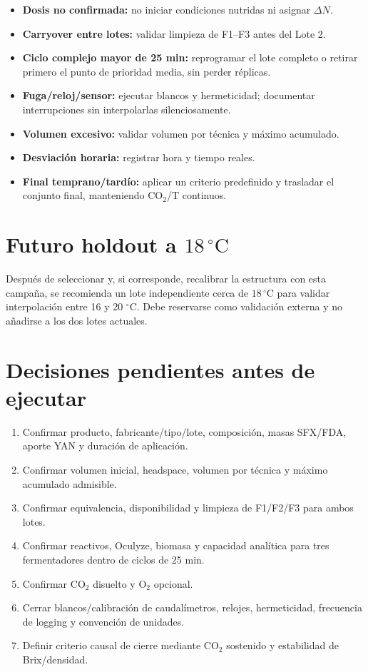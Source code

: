 \documentclass[11pt,a4paper]{article}
\begin{document}
\begin{itemize}[leftmargin=*]
  \item \textbf{Dosis no confirmada:} no iniciar condiciones nutridas ni asignar
  \(\Delta N\).
  \item \textbf{Carryover entre lotes:} validar limpieza de F1--F3 antes del
  Lote 2.
  \item \textbf{Ciclo complejo mayor de 25 min:} reprogramar el lote completo o
  retirar primero el punto de prioridad media, sin perder réplicas.
  \item \textbf{Fuga/reloj/sensor:} ejecutar blancos y hermeticidad; documentar
  interrupciones sin interpolarlas silenciosamente.
  \item \textbf{Volumen excesivo:} validar volumen por técnica y máximo acumulado.
  \item \textbf{Desviación horaria:} registrar hora y tiempo reales.
  \item \textbf{Final temprano/tardío:} aplicar un criterio predefinido y trasladar
  el conjunto final, manteniendo CO$_2$/T continuos.
\end{itemize}

\section{Futuro holdout a \(18\,^{\circ}\mathrm{C}\)}

Después de seleccionar y, si corresponde, recalibrar la estructura con esta
campaña, se recomienda un lote independiente cerca de \(18\,^{\circ}\mathrm{C}\)
para validar interpolación entre 16 y 20 \(^{\circ}\mathrm{C}\). Debe reservarse
como validación externa y no añadirse a los dos lotes actuales.

\section{Decisiones pendientes antes de ejecutar}

\begin{enumerate}[leftmargin=*]
  \item Confirmar producto, fabricante/tipo/lote, composición, masas SFX/FDA,
  aporte YAN y duración de aplicación.
  \item Confirmar volumen inicial, headspace, volumen por técnica y máximo
  acumulado admisible.
  \item Confirmar equivalencia, disponibilidad y limpieza de F1/F2/F3 para ambos
  lotes.
  \item Confirmar reactivos, Oculyze, biomasa y capacidad analítica para tres
  fermentadores dentro de ciclos de 25 min.
  \item Confirmar CO$_2$ disuelto y O$_2$ opcional.
  \item Cerrar blancos/calibración de caudalímetros, relojes, hermeticidad,
  frecuencia de logging y convención de unidades.
  \item Definir criterio causal de cierre mediante CO$_2$ sostenido y estabilidad
  de Brix/densidad.
\end{enumerate}
\end{document}
